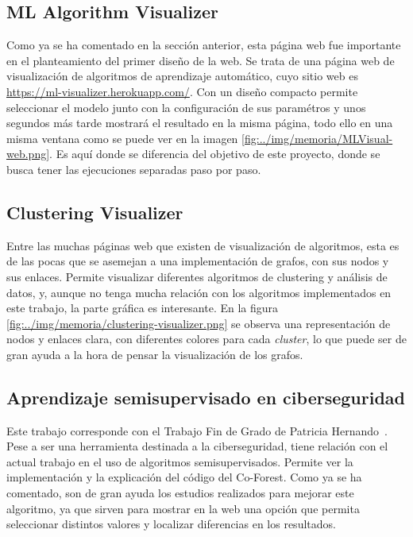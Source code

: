 \subsection{ML Algorithm Visualizer}
Como ya se ha comentado en la sección anterior, esta página web fue importante en el planteamiento del primer diseño de la web. Se trata de una página web de visualización de algoritmos de aprendizaje automático, cuyo sitio web es \url{https://ml-visualizer.herokuapp.com/}. Con un diseño compacto permite seleccionar el modelo junto con la configuración de sus paramétros y unos segundos más tarde mostrará el resultado en la misma página, todo ello en una misma ventana como se puede ver en la imagen \ref{fig:../img/memoria/MLVisual-web.png}. Es aquí donde se diferencia del objetivo de este proyecto, donde se busca tener las ejecuciones separadas paso por paso.


\subsection{Clustering Visualizer}
Entre las muchas páginas web que existen de visualización de algoritmos, esta es de las pocas que se asemejan a una implementación de grafos, con sus nodos y sus enlaces. Permite visualizar diferentes algoritmos de clustering y análisis de datos, y, aunque no tenga mucha relación con los algoritmos implementados en este trabajo, la parte gráfica es interesante. En la figura \ref{fig:../img/memoria/clustering-visualizer.png} se observa una representación de nodos y enlaces clara, con diferentes colores para cada \textit{cluster}, lo que puede ser de gran ayuda a la hora de pensar la visualización de los grafos.
\subsection{Aprendizaje semisupervisado en ciberseguridad}
Este trabajo corresponde con el Trabajo Fin de Grado de Patricia Hernando~\cite{TFG:Patricia}. Pese a ser una herramienta destinada a la ciberseguridad, tiene relación con el actual trabajo en el uso de algoritmos semisupervisados. Permite ver la implementación y la explicación del código del Co-Forest. Como ya se ha comentado, son de gran ayuda los estudios realizados para mejorar este algoritmo, ya que sirven para mostrar en la web una opción que permita seleccionar distintos valores y localizar diferencias en los resultados.


